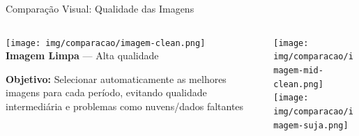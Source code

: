\documentclass[aspectratio=169,11pt]{beamer}
\begin{document}

\begin{frame}{Comparação Visual: Qualidade das Imagens}
\vspace{-0.9cm}
\begin{columns}[c]
    \begin{column}{0.5\textwidth}
        \begin{center}
            \texttt{[image: img/comparacao/imagem-clean.png]}\\[0.2cm]
            {\footnotesize\textbf{Imagem Limpa} --- Alta qualidade}
        \end{center}
        
        \vspace{-0.2cm}
        \begin{center}
            \colorbox{ufal!10}{\parbox{0.9\textwidth}{\centering
                \footnotesize\textbf{Objetivo:} Selecionar automaticamente as melhores imagens para cada período, evitando qualidade intermediária e problemas como nuvens/dados faltantes
            }}
        \end{center}
    \end{column}
    
    \begin{column}{0.48\textwidth}
        \vspace{0.2cm}
        \begin{center}
            \texttt{[image: img/comparacao/imagem-mid-clean.png]}\\[0.2cm]
            
            \texttt{[image: img/comparacao/imagem-suja.png]}
        \end{center}
    \end{column}
\end{columns}
\end{frame}
\end{document}
